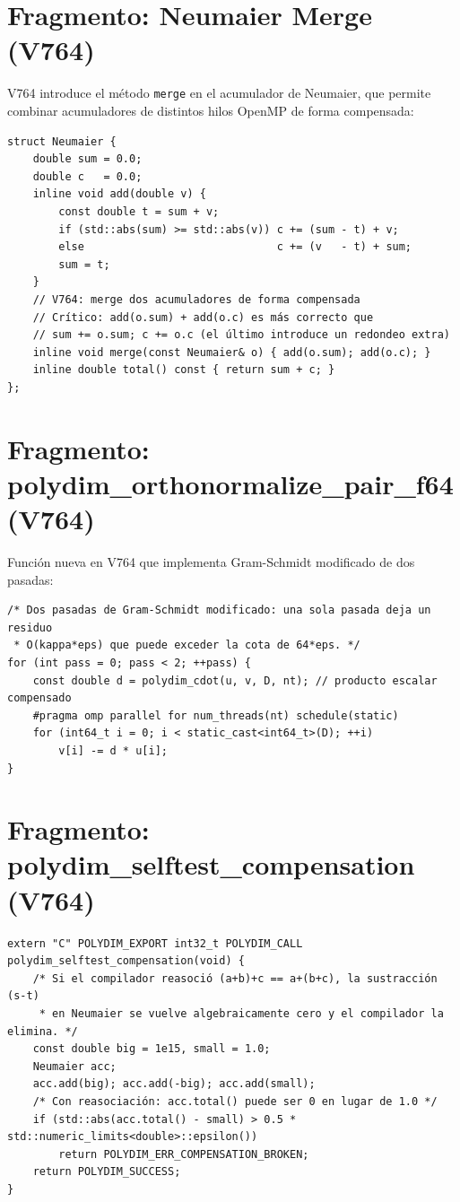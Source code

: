 \section{Fragmento: Neumaier Merge (V764)}


V764 introduce el método \texttt{merge} en el acumulador de Neumaier, que permite combinar
acumuladores de distintos hilos OpenMP de forma compensada:

\begin{verbatim}
struct Neumaier {
    double sum = 0.0;
    double c   = 0.0;
    inline void add(double v) {
        const double t = sum + v;
        if (std::abs(sum) >= std::abs(v)) c += (sum - t) + v;
        else                              c += (v   - t) + sum;
        sum = t;
    }
    // V764: merge dos acumuladores de forma compensada
    // Crítico: add(o.sum) + add(o.c) es más correcto que 
    // sum += o.sum; c += o.c (el último introduce un redondeo extra)
    inline void merge(const Neumaier& o) { add(o.sum); add(o.c); }
    inline double total() const { return sum + c; }
};
\end{verbatim}

\section{Fragmento: polydim\_orthonormalize\_pair\_f64 (V764)}


Función nueva en V764 que implementa Gram-Schmidt modificado de dos pasadas:

\begin{verbatim}
/* Dos pasadas de Gram-Schmidt modificado: una sola pasada deja un residuo
 * O(kappa*eps) que puede exceder la cota de 64*eps. */
for (int pass = 0; pass < 2; ++pass) {
    const double d = polydim_cdot(u, v, D, nt); // producto escalar compensado
    #pragma omp parallel for num_threads(nt) schedule(static)
    for (int64_t i = 0; i < static_cast<int64_t>(D); ++i)
        v[i] -= d * u[i];
}
\end{verbatim}

\section{Fragmento: polydim\_selftest\_compensation (V764)}


\begin{verbatim}
extern "C" POLYDIM_EXPORT int32_t POLYDIM_CALL polydim_selftest_compensation(void) {
    /* Si el compilador reasoció (a+b)+c == a+(b+c), la sustracción (s-t)
     * en Neumaier se vuelve algebraicamente cero y el compilador la elimina. */
    const double big = 1e15, small = 1.0;
    Neumaier acc;
    acc.add(big); acc.add(-big); acc.add(small);
    /* Con reasociación: acc.total() puede ser 0 en lugar de 1.0 */
    if (std::abs(acc.total() - small) > 0.5 * std::numeric_limits<double>::epsilon())
        return POLYDIM_ERR_COMPENSATION_BROKEN;
    return POLYDIM_SUCCESS;
}
\end{verbatim}
